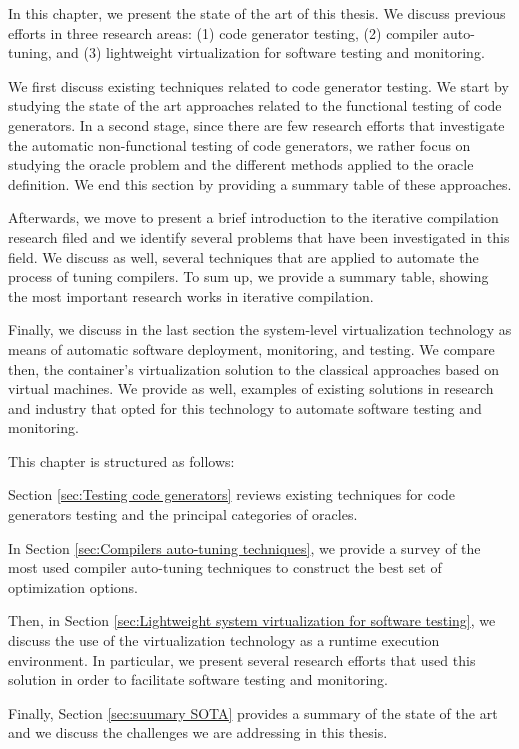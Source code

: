 
In this chapter, we present the state of the art of this thesis. We discuss previous efforts in three research areas: (1) code generator testing, (2) compiler auto-tuning, and (3) lightweight virtualization for software testing and monitoring.

We first discuss existing techniques related to code generator testing. We start by studying the state of the art approaches related to the functional testing of code generators. In a second stage, since there are few research efforts that investigate the automatic non-functional testing of code generators, we rather focus on studying the oracle problem and the different methods applied to the oracle definition. We end this section by providing a summary table of these approaches.

Afterwards, we move to present a brief introduction to the iterative compilation research filed and we identify several problems that have been investigated in this field. We discuss as well, several techniques that are applied to automate the process of tuning compilers. To sum up, we provide a summary table, showing the most important research works in iterative compilation.

Finally, we discuss in the last section the system-level virtualization technology as means of automatic software deployment, monitoring, and testing. We compare then, the container's virtualization solution to the classical approaches based on virtual machines. We provide as well, examples of existing solutions in research and industry that opted for this technology to automate software testing and monitoring.

This chapter is structured as follows: 

Section \ref{sec:Testing code generators} reviews existing techniques for code generators testing and the principal categories of oracles. 

In Section \ref{sec:Compilers auto-tuning techniques}, we provide a survey of the most used compiler auto-tuning techniques to construct the best set of optimization options. 

Then, in Section \ref{sec:Lightweight system virtualization for software testing}, we discuss the use of the virtualization technology as a runtime execution environment. In particular, we present several research efforts that used this solution in order to facilitate software testing and monitoring. 

Finally, Section \ref{sec:suumary SOTA} provides a summary of the state of the art and we discuss the challenges we are addressing in this thesis.

